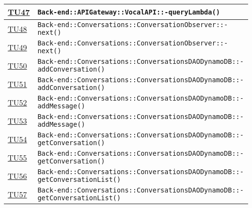 \begin{longtable}{|>{\centering}m{1cm}|m{12cm}<{\centering}|}
\hyperlink{TU47}{TU47} & \texttt{Back-end::APIGateway::VocalAPI::-\linebreak queryLambda()}\\ \hline

\hyperlink{TU48}{TU48} & \texttt{Back-end::Conversations::ConversationObserver::-\linebreak next()}\\ \hline

\hyperlink{TU49}{TU49} & \texttt{Back-end::Conversations::ConversationObserver::-\linebreak next()}\\ \hline

\hyperlink{TU50}{TU50} & \texttt{Back-end::Conversations::ConversationsDAODynamoDB::-\linebreak addConversation()}\\ \hline

\hyperlink{TU51}{TU51} & \texttt{Back-end::Conversations::ConversationsDAODynamoDB::-\linebreak addConversation()}\\ \hline

\hyperlink{TU52}{TU52} & \texttt{Back-end::Conversations::ConversationsDAODynamoDB::-\linebreak addMessage()}\\ \hline

\hyperlink{TU53}{TU53} & \texttt{Back-end::Conversations::ConversationsDAODynamoDB::-\linebreak addMessage()}\\ \hline

\hyperlink{TU54}{TU54} & \texttt{Back-end::Conversations::ConversationsDAODynamoDB::-\linebreak getConversation()}\\ \hline

\hyperlink{TU55}{TU55} & \texttt{Back-end::Conversations::ConversationsDAODynamoDB::-\linebreak getConversation()}\\ \hline

\hyperlink{TU56}{TU56} & \texttt{Back-end::Conversations::ConversationsDAODynamoDB::-\linebreak getConversationList()}\\ \hline

\hyperlink{TU57}{TU57} & \texttt{Back-end::Conversations::ConversationsDAODynamoDB::-\linebreak getConversationList()}\\ \hline


\end{longtable}
